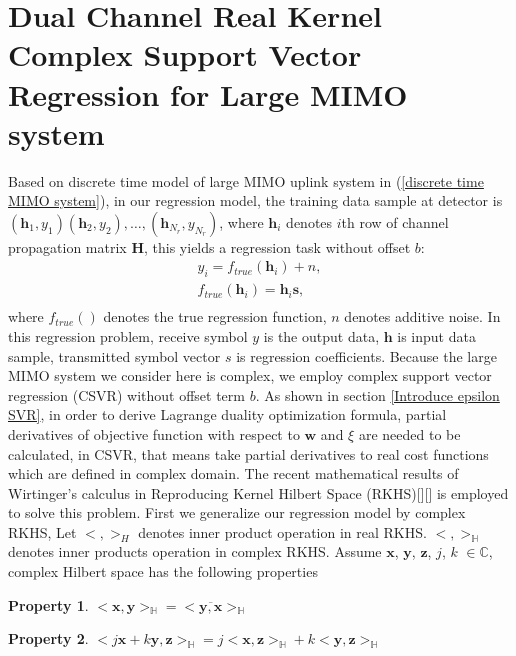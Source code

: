 \documentclass[12pt, draftclsnofoot, onecolumn]{IEEEtran}
\begin{document}
\section{Dual Channel Real Kernel Complex Support Vector Regression for Large MIMO system}\label{dual channel CSVR}
 Based on discrete time model of large MIMO uplink system in (\ref{discrete time MIMO system}), in our  regression model, the training data sample at detector is $(\mathbf{h}_{1}, y_{1})(\mathbf{h}_{2}, y_{2}), \ldots, (\mathbf{h}_{N_{r}}, y_{N_{r}})$, where $\mathbf{h}_{i}$ denotes $i$th row of channel propagation matrix $\mathbf{H}$, this yields a regression task without offset $b$:  
 \begin{eqnarray}
 y_{i}=f_{true}(\mathbf{h}_{i})+n,\\
 \label{regression part1a}
 f_{true}(\mathbf{h}_{i})=\mathbf{h}_{i}\mathbf{s},\\
 \label{regression part1b}
 \end{eqnarray}
 where $f_{true}()$ denotes the true regression function, $n$ denotes additive noise.
In this regression problem, receive symbol $y$ is the output data, $\mathbf{h}$ is input data sample, transmitted symbol vector $s$ is regression coefficients. Because the large MIMO system we consider here is complex, we employ complex support vector regression (CSVR) without offset term $b$. As shown in section \ref{Introduce epsilon SVR}, in order to derive Lagrange duality optimization formula, partial derivatives of objective function with respect to $\mathbf{w}$ and $\xi$ are needed to be calculated, in CSVR, that means take partial derivatives to real cost functions which are defined in complex domain. The recent mathematical results of Wirtinger's calculus in Reproducing Kernel Hilbert Space (RKHS)[\cite{wirtinger's calculus}][\cite {reproducing Kernel Hilbert Space}] is employed to solve this problem. First we generalize our regression model by complex RKHS, 
Let $<,>_{H}$ denotes inner product operation in real RKHS. $<,>_{\mathbb{H}}$ denotes inner products operation in complex RKHS. Assume $\mathbf{x}$, $\mathbf{y}$, $\mathbf{z}$, $j$, $k$ $\in \mathbb{C}$, complex Hilbert space has the following properties 
\newtheorem{Lemma}{Lemma}
\newtheorem{Property}{Property}
\begin{Property}
 $<\mathbf{x},\mathbf{y}>_{\mathbb{H}}=<\overline{\mathbf{y},\mathbf{x}}>_{\mathbb{H}}$
\label{CHSProperty1}
\end{Property}

\begin{Property}
$<j\mathbf{x}+k\mathbf{y},\mathbf{z}>_{\mathbb{H}}=j<\mathbf{x},\mathbf{z}>_{\mathbb{H}}+k<\mathbf{y},\mathbf{z}>_{\mathbb{H}}$
\label{CHSProperty2}
\end{Property}
\end{document}
